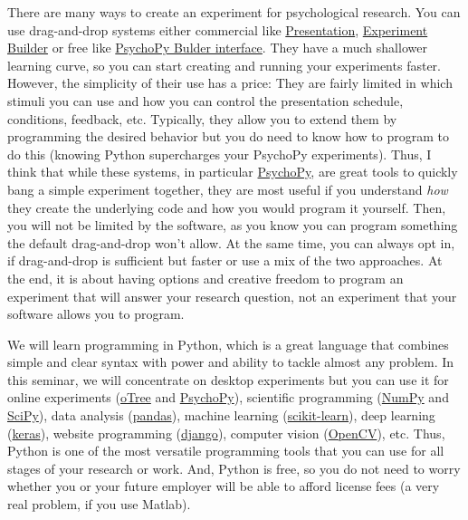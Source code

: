 \documentclass[
]{book}
\begin{document}
There are many ways to create an experiment for psychological research. You can use drag-and-drop systems either commercial like \href{https://www.neurobs.com/}{Presentation}, \href{https://www.sr-research.com/experiment-builder/}{Experiment Builder} or free like \href{https://psychopy.org/builder}{PsychoPy Bulder interface}. They have a much shallower learning curve, so you can start creating and running your experiments faster. However, the simplicity of their use has a price: They are fairly limited in which stimuli you can use and how you can control the presentation schedule, conditions, feedback, etc. Typically, they allow you to extend them by programming the desired behavior but you do need to know how to program to do this (knowing Python supercharges your PsychoPy experiments). Thus, I think that while these systems, in particular \href{https://psychopy.org/}{PsychoPy}, are great tools to quickly bang a simple experiment together, they are most useful if you understand \emph{how} they create the underlying code and how you would program it yourself. Then, you will not be limited by the software, as you know you can program something the default drag-and-drop won't allow. At the same time, you can always opt in, if drag-and-drop is sufficient but faster or use a mix of the two approaches. At the end, it is about having options and creative freedom to program an experiment that will answer your research question, not an experiment that your software allows you to program.

We will learn programming in Python, which is a great language that combines simple and clear syntax with power and ability to tackle almost any problem. In this seminar, we will concentrate on desktop experiments but you can use it for online experiments (\href{https://otree.readthedocs.io/en/latest/}{oTree} and \href{https://psychopy.org/}{PsychoPy}), scientific programming (\href{https://numpy.org/}{NumPy} and \href{https://www.scipy.org/}{SciPy}), data analysis (\href{https://pandas.pydata.org/}{pandas}), machine learning (\href{https://scikit-learn.org/}{scikit-learn}), deep learning (\href{https://keras.io/}{keras}), website programming (\href{https://www.djangoproject.com/}{django}), computer vision (\href{https://opencv.org/}{OpenCV}), etc. Thus, Python is one of the most versatile programming tools that you can use for all stages of your research or work. And, Python is free, so you do not need to worry whether you or your future employer will be able to afford license fees (a very real problem, if you use Matlab).
\end{document}
